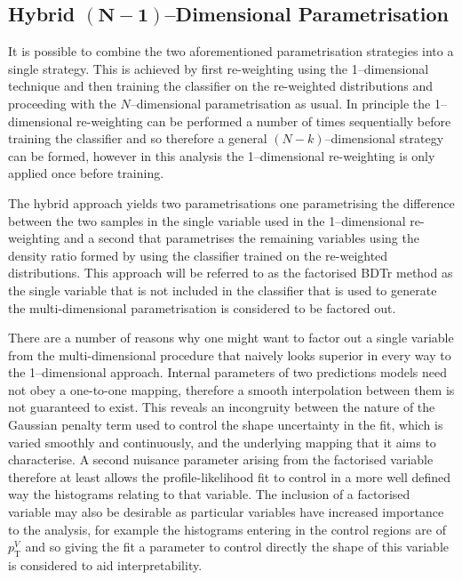 \subsection{Hybrid $\mathbf{(N - 1)}$--Dimensional Parametrisation}
\label{sec:hybrid-reweight}

It is possible to combine the two aforementioned parametrisation strategies into
a single strategy. This is achieved by first re-weighting using the
1--dimensional technique and then training the classifier on the re-weighted
distributions and proceeding with the $N$--dimensional parametrisation as usual.
In principle the 1--dimensional re-weighting can be performed a number of times
sequentially before training the classifier and so therefore a general
$(N-k)$--dimensional strategy can be formed, however in this analysis the
1--dimensional re-weighting is only applied once before training.

The hybrid approach yields two parametrisations one parametrising the
difference between the two samples in the single variable used in the
1--dimensional re-weighting and a second that parametrises the remaining
variables using the density ratio formed by using the classifier trained on the
re-weighted distributions. This approach will be referred to as the factorised
BDTr method as the single variable that is not included in the classifier that
is used to generate the multi-dimensional parametrisation is considered to be
factored out.

There are a number of reasons why one might want to factor out a single variable
from the multi-dimensional procedure that naively looks superior in every way to
the 1--dimensional approach. Internal parameters of two predictions models need
not obey a one-to-one mapping, therefore a smooth interpolation between them is
not guaranteed to exist. This reveals an incongruity between the nature of the
Gaussian penalty term used to control the shape uncertainty in the fit, which is
varied smoothly and continuously, and the underlying mapping that it aims to
characterise.  A second nuisance parameter arising from the factorised variable
therefore at least allows the profile-likelihood fit to control in a more
well defined way the histograms relating to that variable. The inclusion of a
factorised variable may also be desirable as particular variables have increased
importance to the analysis, for example the histograms entering in the control
regions are of $p_{\mathrm{T}}^V$ and so giving the fit a parameter to control
directly the shape of this variable is considered to aid interpretability.

